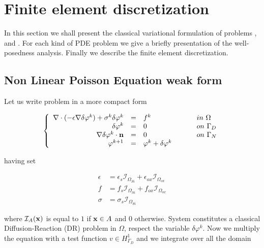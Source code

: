 \chapter{Finite element discretization}
\label{chap: finite element}

In this section we shall present the classical variational formulation of problems ,  and . For each kind of PDE problem we give a briefly presentation of the well-posedness analysis. Finally we describe the finite element discretization. 


\section{Non Linear Poisson Equation weak form}

Let us write problem  in a more compact form

\begin{equation}
\label{sys: NLP general problem linearized}
\left\{
\begin{array}{rcll}
\nabla \cdot (-\epsilon \nabla \delta \varphi^k) + \sigma^k \delta \varphi^k & = &  f^k & \psp{15} in \psp{2} \Omega \\
\delta \varphi^k & = & 0 & \psp{15} on \psp{2} \Gamma_D \\
\nabla \delta \varphi ^k\cdot \vect{n} & = & 0 & \psp{15} on \psp{2} \Gamma_N
\\
\varphi^{k+1} & = & \varphi^k + \delta \varphi^k
\end{array}
\right.
\end{equation}

having set

\begin{align*}
\epsilon & = \epsilon_s \mathcal{I}_{\Omega_{Si}} + \epsilon_{ox} \mathcal{I}_{\Omega_{ox}} \\
f & = f_s \mathcal{I}_{\Omega_{Si}} + f_{ox} \mathcal{I}_{\Omega_{ox}} \\
\sigma & = \sigma_s \mathcal{I}_{\Omega_{Si}}
\end{align*}

where $\mathcal{I}_A(\mathbf{x})$ is equal to $1$ if $\mathbf{x}\in A$ and $0$ otherwise.
System  constitutes a classical Diffusion-Reaction (DR) problem in $\Omega$, respect the variable $\delta \varphi^k$. 
Now we multiply the equation with a test function $v \in H^1_{\Gamma_D}$ and we integrate over all the domain

